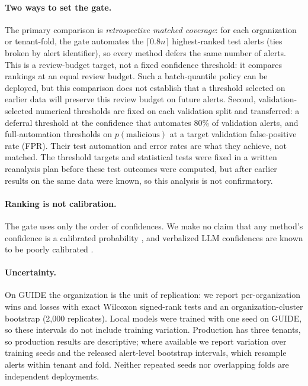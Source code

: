 \documentclass[letterpaper]{article} %
\begin{document}
\paragraph{Two ways to set the gate.} The primary comparison is \emph{retrospective matched coverage}: for each organization or tenant-fold, the gate automates the $\lceil 0.8n\rceil$ highest-ranked test alerts (ties broken by alert identifier), so every method defers the same number of alerts. This is a review-budget target, not a fixed confidence threshold: it compares rankings at an equal review budget. Such a batch-quantile policy can be deployed, but this comparison does not establish that a threshold selected on earlier data will preserve this review budget on future alerts. Second, validation-selected numerical thresholds are fixed on each validation split and transferred: a deferral threshold at the confidence that automates 80\% of validation alerts, and full-automation thresholds on $p(\text{malicious})$ at a target validation false-positive rate (FPR). Their test automation and error rates are what they achieve, not matched. The threshold targets and statistical tests were fixed in a written reanalysis plan before these test outcomes were computed, but after earlier results on the same data were known, so this analysis is not confirmatory.

\paragraph{Ranking is not calibration.} The gate uses only the order of confidences. We make no claim that any method's confidence is a calibrated probability \citep{guo2017calibration}, and verbalized LLM confidences are known to be poorly calibrated \citep{xiong2024uncertainty}.

\paragraph{Uncertainty.} On GUIDE the organization is the unit of replication: we report per-organization wins and losses with exact Wilcoxon signed-rank tests and an organization-cluster bootstrap (2,000 replicates). Local models were trained with one seed on GUIDE, so these intervals do not include training variation. Production has three tenants, so production results are descriptive; where available we report variation over training seeds and the released alert-level bootstrap intervals, which resample alerts within tenant and fold. Neither repeated seeds nor overlapping folds are independent deployments.
\end{document}

